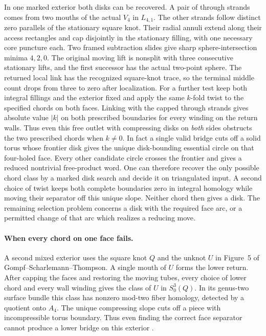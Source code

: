 \documentclass[11pt,letterpaper]{article}
\numberwithin{equation}{section}
\begin{document}
In one marked exterior both disks can be recovered. A pair of
through strands comes from two mouths of the actual \(V_4\) in
\(L_{4,1}\). The other strands follow distinct zero parallels of the
stationary square knot. Their radial annuli extend along their access
rectangles and cap disjointly in the stationary filling, with one
necessary core puncture each. Two framed subtraction slides give
sharp sphere-intersection minima \(4,2,0\). The original moving
lift is nonsplit with three consecutive stationary lifts, and the
first successor has the actual two-point sphere. The returned local
link has the recognized square-knot trace, so the terminal middle
count drops from three to zero after localization. For a further
test keep both integral fillings and the exterior fixed and apply
the same \(k\)-fold twist to the specified chords on both faces.
Linking with the capped through strands gives absolute value
\(\lvert k\rvert\) on both prescribed boundaries for every winding
on the return walls. Thus even this free outlet with compressing
disks on \emph{both} sides obstructs the two prescribed chords
when \(k\ne0\). In fact a single valid bridge cuts off a solid torus
whose frontier disk gives the unique disk-bounding essential circle
on that four-holed face. Every other candidate circle crosses the
frontier and gives a reduced nontrivial free-product word. One can
therefore recover the only possible chord class by a marked disk
search and decide it on triangulated input. A second choice of twist
keeps both complete boundaries zero in integral homology while moving
their separator off this unique slope. Neither chord then gives a disk.
The remaining selection problem concerns a disk
with the required face arc, or a permitted change of that arc
which realizes a reducing move.

\paragraph{When every chord on one face fails.}
A second mixed exterior uses the square knot \(Q\) and the unknot
\(U\) in Figure~5 of Gompf--Scharlemann--Thompson. A single mouth
of \(U\) forms the lower return. After capping the faces and restoring
the moving tubes, every choice of lower chord and every wall winding
gives the class of \(U\) in \(S^3_0(Q)\). In its genus-two surface
bundle this class has nonzero mod-two fiber homology, detected by a
quotient onto \(A_4\). The unique compressing slope cuts off a piece
with incompressible torus boundary. Thus even finding the correct
face separator cannot produce a lower bridge on this exterior
\cite[Figure 5 and Corollary 6.4]{GompfScharlemannThompson2010,Baker2026HandleCuts}.
\end{document}
